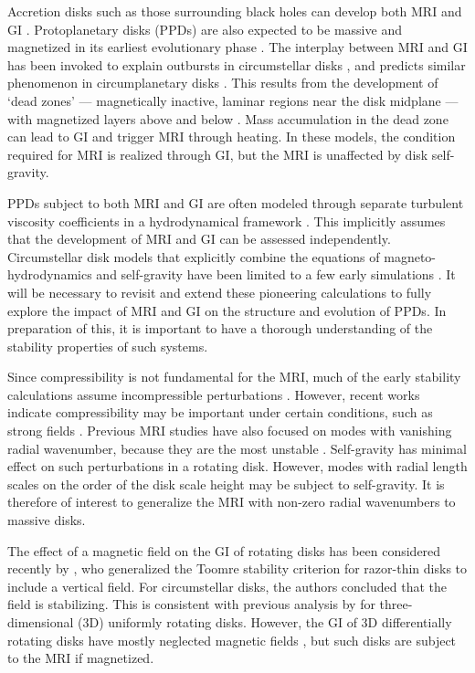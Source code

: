 \documentclass[iop]{emulateapj}
\begin{document}
Accretion disks such as those surrounding black holes can develop both
MRI and GI \citep{menou01,goodman03}.  
Protoplanetary disks (PPDs) are also expected to be massive and  
magnetized in its earliest evolutionary phase \citep{inutsuka10}.  
The interplay between MRI and GI has been invoked to explain outbursts
in circumstellar disks \citep{armitage01, zhu10a, zhu10b,
  martin12b}, and predicts similar phenomenon in circumplanetary disks
\citep{lubow12}. This results from the development of `dead zones' 
--- magnetically inactive, laminar regions near the disk midplane --- with
magnetized layers above and below 
\citep{gammie96,martin12,landry13}. Mass accumulation in the dead zone can lead to
GI and trigger MRI through heating. In these models, the condition required
for MRI is realized through GI, but the MRI is unaffected by disk
self-gravity. 


PPDs subject to both MRI and GI are often modeled through separate
turbulent viscosity coefficients in a hydrodynamical framework 
\citep{terquem08}. This implicitly assumes that the development of MRI 
and GI can be assessed independently. 
Circumstellar disk models that explicitly combine the equations of magneto-hydrodynamics
and self-gravity have been limited to a few early simulations 
\citep{fromang04,fromang04b,fromang05}. It will be necessary to 
revisit and extend these pioneering calculations to fully explore the
impact of MRI and GI on the structure and evolution of PPDs. In
preparation of this, it is important to have a thorough understanding
of the stability properties of such systems.  


Since compressibility is not fundamental for the MRI, much of the
early stability calculations assume incompressible perturbations
\citep{goodman94,jin96}. However, recent works indicate
compressibility may be important under certain conditions,
such as strong fields \citep{kim00, pessah05,bonanno07}.   
Previous MRI studies have also focused on modes with vanishing
radial wavenumber, because they are the most unstable
\citep{sano99,reyes01}. Self-gravity has minimal effect on such
perturbations in a rotating disk. However, modes
with radial length scales on the order of the disk scale height may be
subject to self-gravity. It is therefore of interest to generalize the MRI with
non-zero radial wavenumbers to massive disks. 



The effect of a magnetic field on the GI of rotating disks has been
considered recently by \cite{lizano10}, who generalized the Toomre stability
criterion for razor-thin disks to include a vertical field. For
circumstellar disks, the authors concluded that the field is
stabilizing. This is consistent with previous analysis by
\cite{nakamura83} for three-dimensional (3D) uniformly rotating
disks. However, the GI of 3D differentially rotating disks have
mostly neglected magnetic fields \citep{mamat10,kim12}, but such disks
are subject to the MRI if magnetized. 
\end{document}
